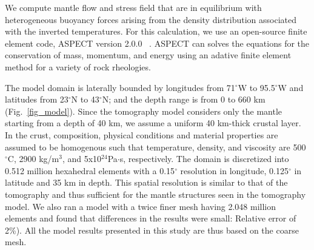 \documentclass[draft,linenumbers]{agujournal2018}
\begin{document}
    We compute mantle flow and stress field that are in equilibrium with heterogeneous buoyancy forces arising from the density distribution associated with the inverted temperatures. For this calculation, we use an open-source finite element code, ASPECT version 2.0.0 ~\citep{heister_aspect_methods2,KHB12,aspect-doi-v2.0.0}. ASPECT can solves the equations for the conservation of mass, momentum, and energy using an adative finite element method for a variety of rock rheologies. 
    
     The model domain is laterally bounded by longitudes from 71$^{\circ}$W to 95.5$^{\circ}$W and latitudes from 23$^{\circ}$N to 43$^{\circ}$N; and the depth range is from 0 to 660 km (Fig.~\ref{fig_model}). Since the tomography model considers only the mantle starting from a depth of 40 km, we assume a uniform 40 km-thick crustal layer. In the crust, composition, physical conditions and material properties are assumed to be homogenous such that temperature, density, and viscosity are 500 $^{\circ}$C, 2900 kg/m$^{3}$, and 5x10$^{24}$Pa$\cdot$s, respectively.  The domain is discretized into 0.512 million hexahedral elements with a 0.15$^{\circ}$ resolution in longitude, 0.125$^{\circ}$ in latitude and 35 km in depth. This spatial resolution is similar to that of the tomography and thus sufficient for the mantle structures seen in the tomography model. We also ran a  model with a twice finer mesh having 2.048 million elements and found that differences in the results were small: Relative error  of 2\%). All the model results presented in this study are thus based on the coarse mesh.
%
\end{document}
